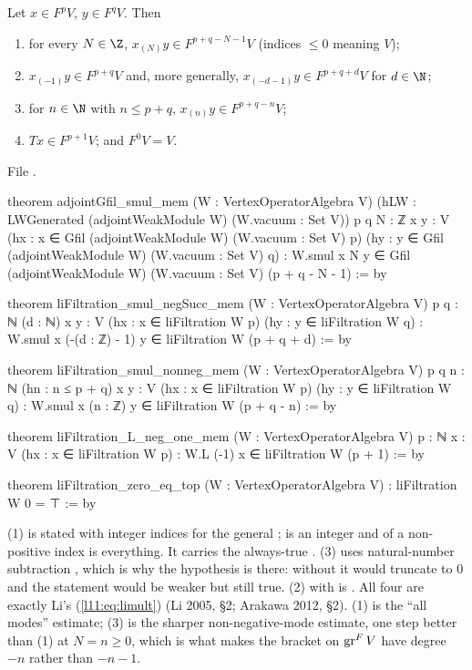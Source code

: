\begin{theorem}\label{l11:thm:limult}
Let $x\in F^pV$, $y\in F^qV$. Then
\begin{enumerate}
\item for every $N\in\Z$, $x_{(N)}y\in F^{p+q-N-1}V$ (indices $\le0$ meaning $V$);
\item $x_{(-1)}y\in F^{p+q}V$ and, more generally, $x_{(-d-1)}y\in F^{p+q+d}V$ for $d\in\N$;
\item for $n\in\N$ with $n\le p+q$, $x_{(n)}y\in F^{p+q-n}V$;
\item $Tx\in F^{p+1}V$; and $F^0V = V$.
\end{enumerate}
\end{theorem}
\noindent File .
\begin{leancode}
theorem adjointGfil_smul_mem (W : VertexOperatorAlgebra V)
    (hLW : LWGenerated (adjointWeakModule W) ({W.vacuum} : Set V))
    {p q N : ℤ} {x y : V}
    (hx : x ∈ Gfil (adjointWeakModule W) ({W.vacuum} : Set V) p)
    (hy : y ∈ Gfil (adjointWeakModule W) ({W.vacuum} : Set V) q) :
    W.smul x N y ∈
      Gfil (adjointWeakModule W) ({W.vacuum} : Set V) (p + q - N - 1) := by

theorem liFiltration_smul_negSucc_mem (W : VertexOperatorAlgebra V)
    {p q : ℕ} (d : ℕ) {x y : V}
    (hx : x ∈ liFiltration W p) (hy : y ∈ liFiltration W q) :
    W.smul x (-(d : ℤ) - 1) y ∈ liFiltration W (p + q + d) := by

theorem liFiltration_smul_nonneg_mem (W : VertexOperatorAlgebra V)
    {p q n : ℕ} (hn : n ≤ p + q) {x y : V}
    (hx : x ∈ liFiltration W p) (hy : y ∈ liFiltration W q) :
    W.smul x (n : ℤ) y ∈ liFiltration W (p + q - n) := by

theorem liFiltration_L_neg_one_mem (W : VertexOperatorAlgebra V) {p : ℕ} {x : V}
    (hx : x ∈ liFiltration W p) : W.L (-1) x ∈ liFiltration W (p + 1) := by

theorem liFiltration_zero_eq_top (W : VertexOperatorAlgebra V) : liFiltration W 0 = ⊤ := by
\end{leancode}

\begin{dictionary}
(1) is stated with integer indices for the general ;  is an integer and
 of a non-positive index is everything. It carries the always-true . (3) uses
natural-number subtraction , which is why the hypothesis  is there:
without it  would truncate to $0$ and the statement would be weaker but still true. (2)
with  is \allowbreak{}\allowbreak{}\allowbreak{}\allowbreak{}. All four are exactly Li's (\ref{l11:eq:limult})
(Li 2005, §2; Arakawa 2012, §2). (1) is the ``all modes'' estimate; (3) is the sharper
non-negative-mode estimate, one step better than (1) at $N = n\ge0$, which is what makes the bracket on
$\operatorname{gr}^FV$ have degree $-n$ rather than $-n-1$.
\end{dictionary}

